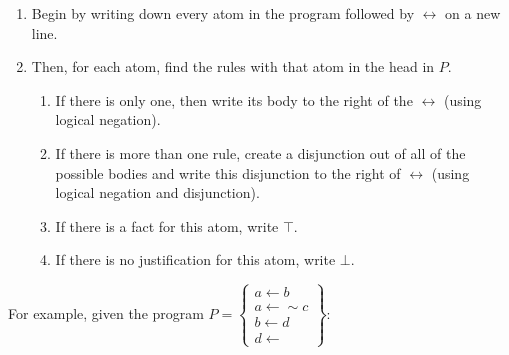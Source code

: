 \documentclass[9pt,a4paper,landscape]{article}
\begin{document}
{\begin{enumerate}[noitemsep]
	\item Begin by writing down every atom in the program followed by $\leftrightarrow$ on a new line.
	\item Then, for each atom, find the rules with that atom in the head in $P$.
	\begin{enumerate}[noitemsep]
		\item If there is only one, then write its body to the right of the $\leftrightarrow$ (using logical negation).
		\item If there is more than one rule, create a disjunction out of all of the possible bodies and write this disjunction to the right of $\leftrightarrow$ (using logical negation and disjunction).
		\item If there is a fact for this atom, write $\top$.
		\item If there is no justification for this atom, write $\bot$.
	\end{enumerate}
\end{enumerate}

For example, given the program $P = \left\{\begin{array}{l}
a \leftarrow b \\
a \leftarrow {\sim} c \\
b \leftarrow d\\
d \leftarrow 
\end{array}\right\}$:

}
\end{document}
